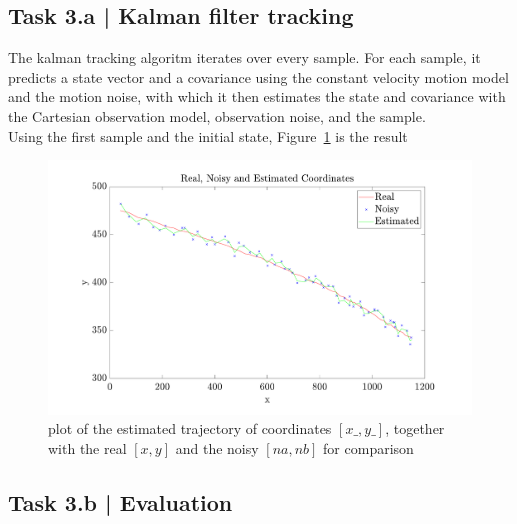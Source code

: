 \documentclass[conference]{IEEEtran}
\begin{document}
    \subsection*{Task 3.a | Kalman filter tracking}

        The kalman tracking algoritm iterates over every sample. For each sample, it predicts a state vector and a covariance using the constant 
        velocity motion model and the motion noise, with which it then estimates the state and covariance with the Cartesian observation model,
        observation noise, and the sample.\\
        Using the first sample and the initial state, Figure~\ref{fig:kalman} is the result
        \begin{figure}[htbp]
            \centering
            \includegraphics[width=\columnwidth]{figures/kalman.pdf}
            \caption{plot of the estimated trajectory of coordinates $[x\_, y\_]$, together with the real $[x,y]$ and the noisy $[na, nb]$ for comparison\label{fig:kalman}}
        \end{figure}

        \subsection*{Task 3.b | Evaluation}
\end{document}
